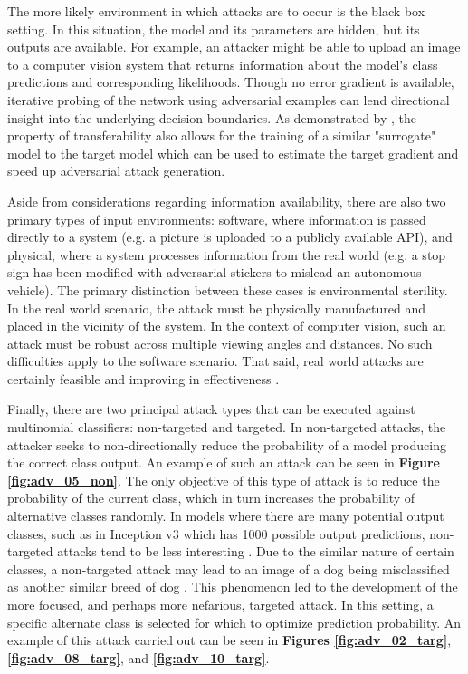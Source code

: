 \documentclass[]{article}
\begin{document}
The more likely environment in which attacks are to occur is the black box setting. In this situation, the model and its parameters are hidden, but its outputs are available. For example, an attacker might be able to upload an image to a computer vision system that returns information about the model's class predictions and corresponding likelihoods. Though no error gradient is available, iterative probing of the network using adversarial examples can lend directional insight into the underlying decision boundaries. As demonstrated by \citet{DBLP:journals/corr/PapernotMG16}, the property of transferability also allows for the training of a similar "surrogate" model to the target model which can be used to estimate the target gradient and speed up adversarial attack generation.

Aside from considerations regarding information availability, there are also two primary types of input environments: software, where information is passed directly to a system (e.g. a picture is uploaded to a publicly available API), and physical, where a system processes information from the real world (e.g. a stop sign has been modified with adversarial stickers to mislead an autonomous vehicle). The primary distinction between these cases is environmental sterility. In the real world scenario, the attack must be physically manufactured and placed in the vicinity of the system. In the context of computer vision, such an attack must be robust across multiple viewing angles and distances. No such difficulties apply to the software scenario. That said, real world attacks are certainly feasible and improving in effectiveness \citep{DBLP:journals/corr/PapernotMGJCS16, DBLP:journals/corr/EvtimovEFKLPRS17}.

Finally, there are two principal attack types that can be executed against multinomial classifiers: non-targeted and targeted. In non-targeted attacks, the attacker seeks to non-directionally reduce the probability of a model producing the correct class output. An example of such an attack can be seen in \textbf{Figure \ref{fig:adv_05_non}}. The only objective of this type of attack is to reduce the probability of the current class, which in turn increases the probability of alternative classes randomly. In models where there are many potential output classes, such as in Inception v3 which has 1000 possible output predictions, non-targeted attacks tend to be less interesting \citep{DBLP:journals/corr/SzegedyVISW15}. Due to the similar nature of certain classes, a non-targeted attack may lead to an image of a dog being misclassified as another similar breed of dog \citep{DBLP:journals/corr/KurakinGB16}. This phenomenon led to the development of the more focused, and perhaps more nefarious, targeted attack. In this setting, a specific alternate class is selected for which to optimize prediction probability. An example of this attack carried out can be seen in \textbf{Figures \ref{fig:adv_02_targ}}, \textbf{\ref{fig:adv_08_targ}}, and \textbf{\ref{fig:adv_10_targ}}.
\end{document}
